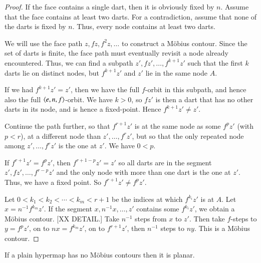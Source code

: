 \begin{proof}  If the face contains a single dart, then it is
obviously fixed by $n$.  Assume that the face contains at least two
darts.  For a contradiction, assume that none of the darts is fixed
by $n$.  Thus, every node contains at least two darts.

We will use the face path $z,f z,f^2 z,\ldots$ to construct a
M\"obius contour. Since the set of darts is finite, the face path
must eventually revisit a node already encountered.  Thus, we can
find a subpath $z',f z',\ldots,f^{k+1} z'$ such that the first $k$
darts lie on distinct nodes, but $f^{k+1} z'$ and $z'$ lie in the
same node $A$.

If we had $f^{k+1} z' = z'$, then we have the full $f$-orbit in this
subpath, and hence also the full $\langle e,n,f\rangle$-orbit.  We have
$k>0$, so $f z'$ is then a dart that has no other darts in its node,
and is hence a fixed-point.  Hence $f^{k+1} z'\ne z'$.

Continue the path further, so that $f^{r+1} z'$ is at the same node
as some $f^p z'$ (with $p < r$), at a different node than
$z',\ldots,f^r z'$, but so that the only repeated node among
$z',\ldots,f^r z'$ is the one at $z'$.  We have $0 < p$.

If $f^{r+1} z' = f^p z'$, then $f^{r+1-p} z' = z'$ so all darts are
in the segment $z',f z',\ldots,f^{r-p} z'$ and the only node with
more than one dart is the one at $z'$.  Thus, we have a fixed point.
So $f^{r+1} z'\ne f^p z'$.

Let $0 < k_1 < k_2 < \cdots < k_m < r+1$ be the indices at which
$f^{k_i} z'$ is at $A$.  Let $x = n^{-1} f^{k_m} z'$. If the segment
$x,n^{-1} x,\ldots,z'$ contains some $f^{k_i} z'$, we obtain a
M\"obius contour.  [XX DETAIL.]  Take $n^{-1}$ steps from $x$ to
$z'$. Then take $f$-steps to $y = f^p z'$, on to $n x = f^{k_m} z'$,
on to $f^{r+1} z'$, then $n^{-1}$ steps to $n y$.  This is a
M\"obius contour.
\end{proof}

\begin{lemma}  If a plain hypermap
has no M\"obius contours then it is planar.
\end{lemma}

